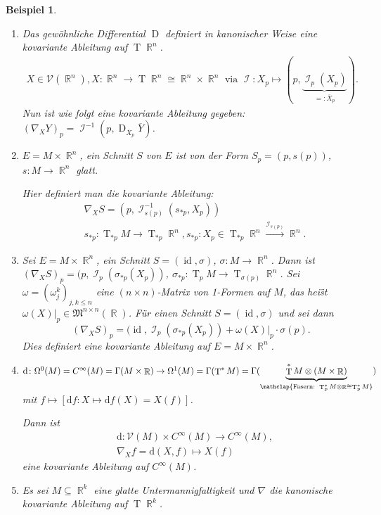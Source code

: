 \documentclass[paper=A4, twoside, chapterprefix=true, bibliography=totoc, headsepline]{scrbook}
\DeclareMathOperator{\R}{\mathbb{R}}
\DeclareMathOperator{\calI}{\mathcal{I}}
\DeclareMathOperator{\D}{D}         %
\DeclareMathOperator{\Id}{id}       %
\DeclareMathOperator{\T}{T}         %
\newcommand{\dop}{\mathrm{d}}
\newcommand{\X}{\times}
\theoremstyle{plain}
\theoremstyle{nonumberplain}
\newtheorem{bsp}{Beispiel}
\theoremstyle{empty}
\theoremstyle{break}
\begin{document}
\begin{bsp}
  \begin{enumerate}[label=(\arabic*),leftmargin=*]
  \item Das gew\"ohnliche Differential $\D$ definiert in kanonischer Weise eine kovariante Ableitung auf $\T\R^n$.
    \begin{align*}
      X \in \mathcal V(\R^n), X \colon \R^n \to \T\R^n \cong \R^n \times \R^n \text{ via } \calI\colon X_p \mapsto (p,\underbrace{\calI_p(X_p)}_{=:\overline X_p}).
    \end{align*}
    Nun ist wie folgt eine kovariante Ableitung gegeben: $(\nabla_XY)_p = \calI^{-1}(p,\D_{\overline X_p}\overline Y)$.
  \item $E = M \times \R^n$, ein Schnitt $S$ von $E$ ist von der Form $S_p = (p,s(p))$, $s \colon M \to \R^n$ glatt.

    Hier definiert man die kovariante Ableitung:
    \begin{align*}
      & \nabla_XS = (p,\calI_{s(p)}^{-1}(s_{*p},X_p))\\
      &  s_{*p}\colon \T_{*p}M \to \T_{*p}\R^n, s_{*p}\colon X_p \in \T_{*p}\R^n \xrightarrow{\calI_{s(p)}} \R^n.
    \end{align*}
  \item Sei $E = M \times \R^n$, ein Schnitt $S = (\Id, \sigma)$, $\sigma: M \to \R^n$. Dann ist $(\nabla_X S)_p = (p, \calI_p(\sigma_{*p}(X_p))$, $\sigma_{*p}: \T_pM \to \T_{\sigma(p)}\R^n$. Sei $ \omega = (\omega_j^k)_{j,k \le n}$ eine $(n\times n)$-Matrix von 1-Formen auf $M$, das hei\"st $\omega(X)|_p \in \mathfrak M^{n\times n}(\R)$.
    F\"ur einen Schnitt $S = (\Id, \sigma)$ und sei dann
    \[ (\nabla_XS)_p = (\Id, \calI_p(\sigma_{*p}(X_p)) + \omega(X)|_p \cdot \sigma(p). \]
    Dies definiert eine kovariante Ableitung auf $E = M \X \R^n$.
  \item $\dop \colon \Omega^0(M) = C^{\infty}(M) = \Gamma(M\times \R) \to \Omega^1(M) = \Gamma(\T^{*}M) = \Gamma(\underbrace{\T^{*}M \otimes (M \times \R)}_{\mathclap{\text{Fasern: } \T_p^{*}M\otimes\R \cong \T_p^{*}M}})$ mit $f \mapsto [\dop f \colon X \mapsto \dop f(X) = X(f)]$.

    Dann ist
    \begin{align*}
      & \dop \colon \mathcal V(M) \times C^{\infty}(M) \to C^{\infty}(M),\\
      & \nabla_Xf = \dop (X,f) \mapsto X(f)
    \end{align*}
    eine kovariante Ableitung auf $C^{\infty}(M)$.
  \item
    Es sei $M \subseteq \R^k$ eine glatte Untermannigfaltigkeit und $\nabla$ die kanonische kovariante Ableitung auf $\T \R^k$.


\end{enumerate}
\end{bsp}
\end{document}
